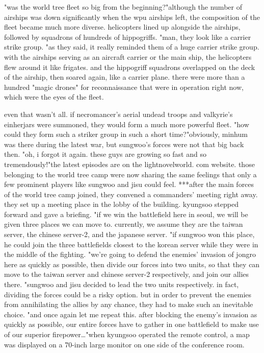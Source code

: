"was the world tree fleet so big from the beginning?"although the number of airships was down significantly when the wpu airships left, the composition of the fleet became much more diverse.
 helicopters lined up alongside the airships, followed by squadrons of hundreds of hippogriffs.
"man, they look like a carrier strike group.
"as they said, it really reminded them of a huge carrier strike group.
with the airships serving as an aircraft carrier or the main ship, the helicopters flew around it like frigates.
 and the hippogriff squadrons overlapped on the deck of the airship, then soared again, like a carrier plane.
 there were more than a hundred "magic drones" for reconnaissance that were in operation right now, which were the eyes of the fleet.

even that wasn't all.
 if necromancer's aerial undead troops and valkyrie's einherjars were summoned, they would form a much more powerful fleet.
"how could they form such a striker group in such a short time?"obviously, minhum was there during the latest war, but sungwoo's forces were not that big back then.
"oh, i forgot it again.
 these guys are growing so fast and so tremendously!"the latest episodes are on the lightnovelworld.
com website.
those belonging to the world tree camp were now sharing the same feelings that only a few prominent players like sungwoo and jisu could feel.
***after the main forces of the world tree camp joined, they convened a commanders' meeting right away.
 they set up a meeting place in the lobby of the building.
kyungsoo stepped forward and gave a briefing.
"if we win the battlefield here in seoul, we will be given three places we can move to.
 currently, we assume they are the taiwan server, the chinese server-2, and the japanese server.
"if sungwoo won this place, he could join the three battlefields closest to the korean server while they were in the middle of the fighting.
"we're going to defend the enemies' invasion of jongro here as quickly as possible, then divide our forces into two units, so that they can move to the taiwan server and chinese server-2 respectively, and join our allies there.
"sungwoo and jisu decided to lead the two units respectively.
in fact, dividing the forces could be a risky option.
 but in order to prevent the enemies from annihilating the allies by any chance, they had to make such an inevitable choice.
"and once again let me repeat this.
 after blocking the enemy's invasion as quickly as possible, our entire forces have to gather in one battlefield to make use of our superior firepower…"when kyungsoo operated the remote control, a map was displayed on a 70-inch large monitor on one side of the conference room.

